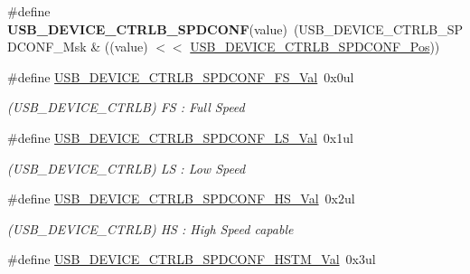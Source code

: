 \begin{DoxyCompactItemize}
\item 
\hypertarget{group___s_a_m_l21___u_s_b_gaa18ba1dd5ddd71fa9f164cb6305f1992}{}\#define {\bfseries U\+S\+B\+\_\+\+D\+E\+V\+I\+C\+E\+\_\+\+C\+T\+R\+L\+B\+\_\+\+S\+P\+D\+C\+O\+N\+F}(value)~(U\+S\+B\+\_\+\+D\+E\+V\+I\+C\+E\+\_\+\+C\+T\+R\+L\+B\+\_\+\+S\+P\+D\+C\+O\+N\+F\+\_\+\+Msk \& ((value) $<$$<$ \hyperlink{group___s_a_m_l21___u_s_b_gab5b9688f10e2ab8aa52f42628139b6eb}{U\+S\+B\+\_\+\+D\+E\+V\+I\+C\+E\+\_\+\+C\+T\+R\+L\+B\+\_\+\+S\+P\+D\+C\+O\+N\+F\+\_\+\+Pos}))\label{group___s_a_m_l21___u_s_b_gaa18ba1dd5ddd71fa9f164cb6305f1992}

\item 
\hypertarget{group___s_a_m_l21___u_s_b_ga3be2b809af4ab86f679b64a276ff0cb9}{}\#define \hyperlink{group___s_a_m_l21___u_s_b_ga3be2b809af4ab86f679b64a276ff0cb9}{U\+S\+B\+\_\+\+D\+E\+V\+I\+C\+E\+\_\+\+C\+T\+R\+L\+B\+\_\+\+S\+P\+D\+C\+O\+N\+F\+\_\+\+F\+S\+\_\+\+Val}~0x0ul\label{group___s_a_m_l21___u_s_b_ga3be2b809af4ab86f679b64a276ff0cb9}

\begin{DoxyCompactList}\small\item\em (U\+S\+B\+\_\+\+D\+E\+V\+I\+C\+E\+\_\+\+C\+T\+R\+L\+B) F\+S \+: Full Speed \end{DoxyCompactList}\item 
\hypertarget{group___s_a_m_l21___u_s_b_ga8734dfea787a3ab59ab0704d1a81ca76}{}\#define \hyperlink{group___s_a_m_l21___u_s_b_ga8734dfea787a3ab59ab0704d1a81ca76}{U\+S\+B\+\_\+\+D\+E\+V\+I\+C\+E\+\_\+\+C\+T\+R\+L\+B\+\_\+\+S\+P\+D\+C\+O\+N\+F\+\_\+\+L\+S\+\_\+\+Val}~0x1ul\label{group___s_a_m_l21___u_s_b_ga8734dfea787a3ab59ab0704d1a81ca76}

\begin{DoxyCompactList}\small\item\em (U\+S\+B\+\_\+\+D\+E\+V\+I\+C\+E\+\_\+\+C\+T\+R\+L\+B) L\+S \+: Low Speed \end{DoxyCompactList}\item 
\hypertarget{group___s_a_m_l21___u_s_b_gaf86110a47503261b362a0efa2d2c83a3}{}\#define \hyperlink{group___s_a_m_l21___u_s_b_gaf86110a47503261b362a0efa2d2c83a3}{U\+S\+B\+\_\+\+D\+E\+V\+I\+C\+E\+\_\+\+C\+T\+R\+L\+B\+\_\+\+S\+P\+D\+C\+O\+N\+F\+\_\+\+H\+S\+\_\+\+Val}~0x2ul\label{group___s_a_m_l21___u_s_b_gaf86110a47503261b362a0efa2d2c83a3}

\begin{DoxyCompactList}\small\item\em (U\+S\+B\+\_\+\+D\+E\+V\+I\+C\+E\+\_\+\+C\+T\+R\+L\+B) H\+S \+: High Speed capable \end{DoxyCompactList}\item 
\hypertarget{group___s_a_m_l21___u_s_b_gadbc04e8c5b3f542b3f498c7397f9700d}{}\#define \hyperlink{group___s_a_m_l21___u_s_b_gadbc04e8c5b3f542b3f498c7397f9700d}{U\+S\+B\+\_\+\+D\+E\+V\+I\+C\+E\+\_\+\+C\+T\+R\+L\+B\+\_\+\+S\+P\+D\+C\+O\+N\+F\+\_\+\+H\+S\+T\+M\+\_\+\+Val}~0x3ul\label{group___s_a_m_l21___u_s_b_gadbc04e8c5b3f542b3f498c7397f9700d}


\end{DoxyCompactItemize}
